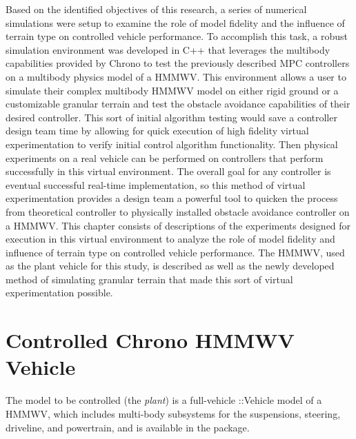 \documentclass[12pt,onecolumn]{report}
\newcommand{\CHRONO}{{\sffamily{{Chrono}}}}
\newcommand{\ChronoVehicle}{{\sffamily{Chrono}}::Vehicle}
\begin{document}
Based on the identified objectives of this research, a series of numerical simulations were setup to examine the role of model fidelity and the influence of terrain type on controlled vehicle performance. To accomplish this task, a robust simulation environment was developed in C++ that leverages the multibody capabilities provided by Chrono to test the previously described MPC controllers on a multibody physics model of a HMMWV. This environment allows a user to simulate their complex multibody HMMWV model on either rigid ground or a customizable granular terrain and test the obstacle avoidance capabilities of their desired controller. This sort of initial algorithm testing would save a controller design team time by allowing for quick execution of high fidelity virtual experimentation to verify initial control algorithm functionality. Then physical experiments on a real vehicle can be performed on controllers that perform successfully in this virtual environment. The overall goal for any controller is eventual successful real-time implementation, so this method of virtual experimentation provides a design team a powerful tool to quicken the process from theoretical controller to physically installed obstacle avoidance controller on a HMMWV. This chapter consists of descriptions of the experiments designed for execution in this virtual environment to analyze the role of model fidelity and influence of terrain type on controlled vehicle performance. The HMMWV, used as the plant vehicle for this study, is described as well as the newly developed method of simulating granular terrain that made this sort of virtual experimentation possible.


\section{Controlled Chrono HMMWV Vehicle}
The model to be controlled (the {\em plant}) is a full-vehicle {\ChronoVehicle} model of a HMMWV, which includes multi-body subsystems for the suspensions, steering, driveline, and powertrain, and is available in the {\CHRONO} package.
\end{document}
